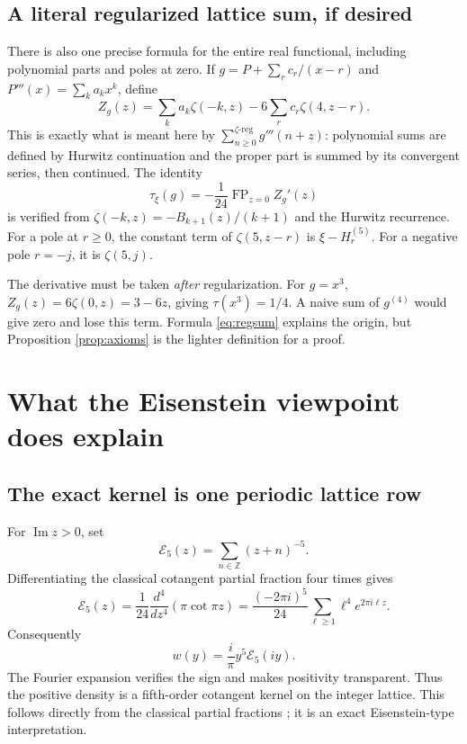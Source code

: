\documentclass[11pt]{article}
\theoremstyle{definition}
\theoremstyle{remark}\newtheorem*{remark}{Remark}
\newcommand{\Z}{\mathbb Z}
\newcommand{\FP}{\operatorname{FP}}
\begin{document}
\subsection{A literal regularized lattice sum, if desired}
There is also one precise formula for the entire real functional, including
polynomial parts and poles at zero. If
$g=P+\sum_r c_r/(x-r)$ and $P'''(x)=\sum_k a_kx^k$, define
\[
 Z_g(z)=\sum_k a_k\zeta(-k,z)-6\sum_r c_r\zeta(4,z-r).
\]
This is exactly what is meant here by $\sum_{n\ge0}^{\zeta\text{-reg}}g'''(n+z)$:
polynomial sums are defined by Hurwitz continuation and the proper part is
summed by its convergent series, then continued. The identity
\begin{equation}\label{eq:regsum}
 \boxed{\displaystyle
 \tau_\xi(g)=-\frac1{24}\FP_{z=0} Z_g'(z)}
\end{equation}
is verified from $\zeta(-k,z)=-B_{k+1}(z)/(k+1)$ and the Hurwitz recurrence.
For a pole at $r\ge0$, the constant term of $\zeta(5,z-r)$ is
$\xi-H_r^{(5)}$. For a negative pole $r=-j$, it is $\zeta(5,j)$.

The derivative must be taken \emph{after} regularization. For $g=x^3$,
$Z_g(z)=6\zeta(0,z)=3-6z$, giving $\tau(x^3)=1/4$.
A naive sum of $g^{(4)}$ would give zero and lose this term. Formula
\eqref{eq:regsum} explains the origin, but Proposition \ref{prop:axioms} is the
lighter definition for a proof.

\section{What the Eisenstein viewpoint does explain}

\subsection{The exact kernel is one periodic lattice row}
For $\operatorname{Im}z>0$, set
\[
 \mathcal E_5(z)=\sum_{n\in\Z}(z+n)^{-5}.
\]
Differentiating the classical cotangent partial fraction four times gives
\begin{equation}\label{eq:cotrow}
 \mathcal E_5(z)=\frac1{24}\frac{d^4}{dz^4}(\pi\cot\pi z)
 =\frac{(-2\pi i)^5}{24}\sum_{\ell\ge1}\ell^4e^{2\pi i\ell z}.
\end{equation}
Consequently
\begin{equation}\label{eq:rowweight}
 \boxed{\displaystyle w(y)=\frac{i}{\pi}y^5\mathcal E_5(iy).}
\end{equation}
The Fourier expansion verifies the sign and makes positivity transparent.
Thus the positive density is a fifth-order cotangent kernel on the integer
lattice. This follows directly from the classical partial fractions
\cite{Cotangent}; it is an exact Eisenstein-type interpretation.
\end{document}
